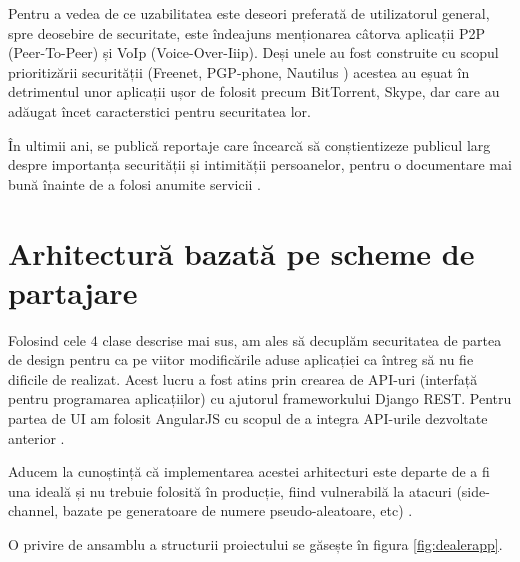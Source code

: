 \documentclass[oneside, 12pt]{book}
\begin{document}
Pentru a vedea de ce uzabilitatea este deseori preferată de utilizatorul general, spre deosebire de securitate, este îndeajuns menționarea câtorva aplicații P2P (Peer-To-Peer) și VoIp (Voice-Over-Iiip). Deși unele au fost construite cu scopul prioritizării securității (Freenet, PGP-phone, Nautilus \cite{website:freenet, website:pgp-phone, website:nautilus}) acestea au eșuat în detrimentul unor aplicații ușor de folosit precum BitTorrent, Skype, dar care au adăugat încet caracterstici pentru securitatea lor.

În ultimii ani, se publică reportaje care încearcă să conștientizeze publicul larg despre importanța securității și intimității persoanelor, pentru o documentare mai bună înainte de a folosi anumite servicii \cite{greenwald:2013nsa, greenwald:2013edward}.
\section{Arhitectură bazată pe scheme de partajare}

Folosind cele $4$ clase descrise mai sus, am ales să decuplăm securitatea de partea de design pentru ca pe viitor modificările aduse aplicației ca întreg să nu fie dificile de realizat. Acest lucru a fost atins prin crearea de API-uri (interfață pentru programarea aplicațiilor) cu ajutorul frameworkului Django REST. Pentru partea de UI am folosit AngularJS cu scopul de a integra API-urile dezvoltate anterior \cite{website:angularjs, website:django-rest}.

Aducem la cunoștință că implementarea acestei arhitecturi este departe de a fi una ideală și nu trebuie folosită în producție, fiind vulnerabilă la atacuri (side-channel, bazate pe generatoare de numere pseudo-aleatoare, etc) \cite{kocher:1996timing, gutterman:2006analysis}.

O privire de ansamblu a structurii proiectului se găsește în figura \ref{fig:dealerapp}.
\end{document}
